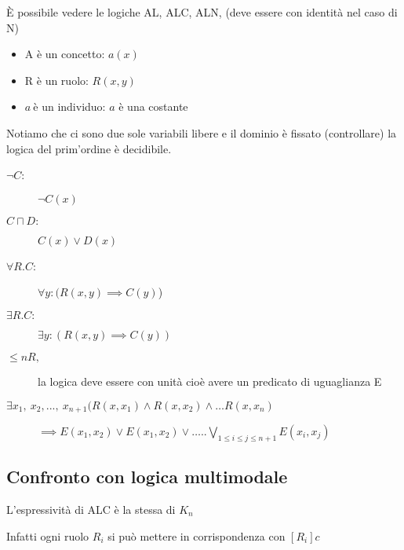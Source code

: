 È possibile vedere le logiche AL, ALC, ALN, (deve essere con identità
nel caso di N)
\begin{itemize}
\item A è un concetto: $a(x)$
\item R è un ruolo: $R(x,y)$
\item $a\ $è un individuo: $a$ è una costante
\end{itemize}
Notiamo che ci sono due sole variabili libere e il dominio è fissato
(controllare) la logica del prim'ordine è decidibile.
\begin{description}
\item [{$\neg C$:}] $\neg C(x)$
\item [{$C\sqcap D\mathbf{:}$}] \foreignlanguage{english}{$C(x)\vee D(x)$}
\item [{$\forall R.C$:}] $\forall y:(R(x,y)\implies C(y)$)
\item [{$\exists R.C:$}] $\exists y:(R(x,y)\implies C(y))$
\item [{$\leq nR$$,$}] la logica deve essere con unità cioè avere un
predicato di uguaglianza E
\item [{$\exists x_{1},\ x_{2},...,\ x_{n+1}(R(x,x_{1})\wedge R(x,x_{2})\wedge\dots R(x,x_{n})$}] $\implies E(x_{1},x_{2})\vee E(x_{1},x_{2})\vee\dots..\underset{1\leq i\leq j\leq n+1}{\bigvee}E(x_{i},x_{j})$
\end{description}

\subsection{Confronto con logica multimodale}

\noindent L'espressività di ALC è la stessa di $K_{n}$ 

\noindent Infatti ogni ruolo $R_{i}$ si può mettere in corrispondenza
con $[R_{i}]c$


